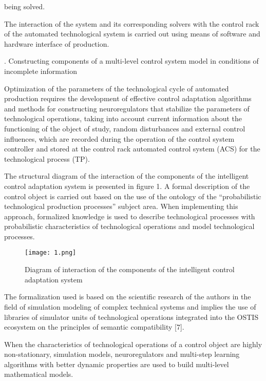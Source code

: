\documentclass{article}
\newcommand{\RomanNumeralCaps}[1]
    {\MakeUppercase{\romannumeral #1}}
\begin{document}
\begin{multicols}{2}
being solved.\par
The interaction of the system and its corresponding
solvers with the control rack of the automated technological system is carried out using means of software and
hardware interface of production.
\begin{center}
\RomanNumeralCaps{3.} Constructing components of a multi-level control
system model in conditions of incomplete information
\end{center}\vspace{-5pt}\par
Optimization of the parameters of the technological
cycle of automated production requires the development
of effective control adaptation algorithms and methods
for constructing neuroregulators that stabilize the parameters of technological operations, taking into account
current information about the functioning of the object
of study, random disturbances and external control influences, which are recorded during the operation of the
control system controller and stored at the control rack
automated control system (ACS) for the technological
process (TP).\par
The structural diagram of the interaction of the components of the intelligent control adaptation system is
presented in figure 1. A formal description of the control
object is carried out based on the use of the ontology
of the “probabilistic technological production processes”
subject area. When implementing this approach, formalized knowledge is used to describe technological processes with probabilistic characteristics of technological
operations and model technological processes.\vspace{0.3cm}
\begin{figure}[H]
    \centering
    \texttt{[image: 1.png]}
 \caption{{\small Diagram of interaction of the components of the intelligent
control adaptation system}}
\end{figure}
The formalization used is based on the scientific research of the authors in the field of simulation modeling
of complex technical systems and implies the use of
libraries of simulator units of technological operations
integrated into the OSTIS ecosystem on the principles
of semantic compatibility [7].\par
When the characteristics of technological operations
of a control object are highly non-stationary, simulation
models, neuroregulators and multi-step learning algorithms with better dynamic properties are used to build
multi-level mathematical models.\par

\end{multicols}
\end{document}
